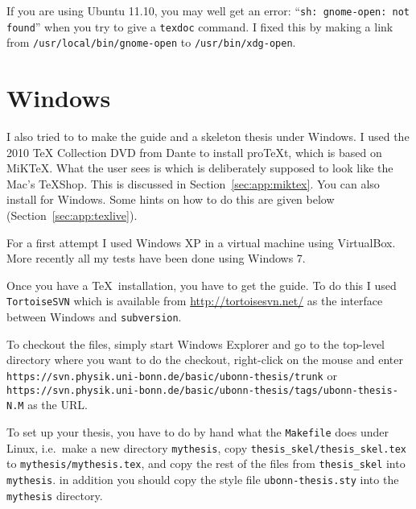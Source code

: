 If you are using Ubuntu 11.10, you may well get an error:
\enquote{\texttt{sh: gnome-open: not found}} when you try to give a
\texttt{texdoc} command. I fixed this by making a
link from \texttt{/usr/local/bin/gnome-open} to
\texttt{/usr/bin/xdg-open}.



\section{Windows}
\label{sec:app:windows}

I also tried to to make the guide and a skeleton thesis under
Windows. I used the 2010 \TeX{} Collection DVD from Dante to install
pro\TeX t, which is based on MiK\TeX. What the user sees is \TeXworks
which is deliberately supposed to look like the Mac's \TeX Shop. This
is discussed in Section~\ref{sec:app:miktex}.
You can also install \TeXLive for Windows. Some hints on how to do
this are given below (Section~\ref{sec:app:texlive}).

For a first attempt I used Windows XP in a virtual machine using
VirtualBox. More recently all my tests have been done using Windows 7.

Once you have a \TeX\ installation, you have to get the guide. To do
this I used \texttt{TortoiseSVN} which is available from
\url{http://tortoisesvn.net/} as the interface between Windows and
\texttt{subversion}.

To checkout the files, simply start Windows Explorer and go to the
top-level directory where you want to do the checkout, right-click on
the mouse and enter\\
\texttt{https://svn.physik.uni-bonn.de/basic/ubonn-thesis/trunk} or\\
\texttt{https://svn.physik.uni-bonn.de/basic/ubonn-thesis/tags/ubonn-thesis-N.M}
as the URL.

To set up your thesis, you have to do by hand what the
\texttt{Makefile} does under Linux, i.e.\ make a new directory
\texttt{mythesis}, copy \texttt{thesis\_skel/thesis\_skel.tex} to
\texttt{mythesis/mythesis.tex}, and copy the rest of the files from
\texttt{thesis\_skel} into \texttt{mythesis}. in addition you should
copy the style file \texttt{ubonn-thesis.sty} into the
\texttt{mythesis} directory.

